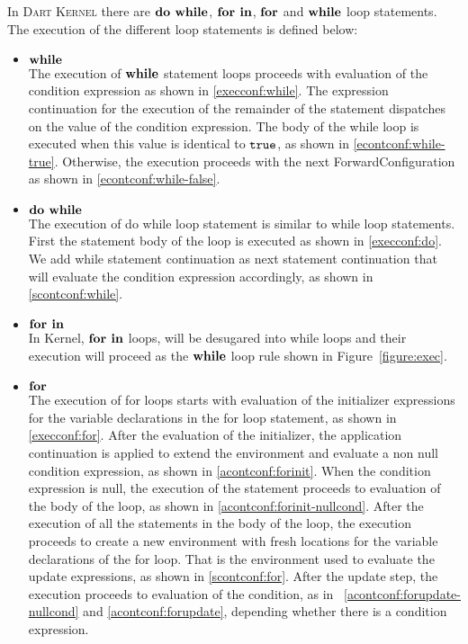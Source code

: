 \documentclass[a4paper,oneside]{article}
\newcommand{\kernel}{\textsc{Dart Kernel}}
\newcommand{\synt}[1]{\ensuremath{\text{\textbf{#1}}}}
\DeclareMathOperator{\dowhile}{\synt{do~while}}
\DeclareMathOperator{\while}{\synt{while}}
\DeclareMathOperator{\forin}{\synt{for~in}}
\DeclareMathOperator{\for}{\synt{for}}
\begin{document}
In \kernel{} there are $\dowhile$, $\forin$, $\for$ and $\while$ loop statements.
The execution of the different loop statements is defined below:

\begin{itemize}
    \item  $\while$\\
        The execution of  $\while$ statement loops proceeds with evaluation of the condition expression as shown in \eqref{execconf:while}.
        The expression continuation for the execution of the remainder of the statement dispatches on the value of the condition expression.
        The body of the while loop is executed when this value is identical to $\tt{true}$, as shown in \eqref{econtconf:while-true}.
        Otherwise, the execution proceeds with the next ForwardConfiguration as shown in \eqref{econtconf:while-false}.
    \item $\dowhile$\\
        The execution of do while loop statement is similar to while loop statements.
        First the statement body of the loop is executed as shown in \eqref{execconf:do}.
        We add while statement continuation as next statement continuation that will evaluate the condition expression accordingly, as shown in \eqref{scontconf:while}.
    \item $\forin$\\
        In Kernel, $\forin$ loops, will be desugared into while loops and their execution will proceed as the $\while$ loop rule shown in Figure~\ref{figure:exec}.
    \item $\for$\\
        The execution of for loops starts with evaluation of the initializer expressions for the variable declarations in the for loop statement, as shown in \eqref{execconf:for}.
        After the evaluation of the initializer, the application continuation is applied to extend the environment and evaluate a non null condition expression, as shown in \eqref{acontconf:forinit}.
        When the condition expression is null, the execution of the statement proceeds to evaluation of the body of the loop, as shown in \eqref{acontconf:forinit-nullcond}.
        After the execution of all the statements in the body of the loop, the execution proceeds to create a new environment with fresh locations for the variable declarations of the for loop.
        That is the environment used to evaluate the update expressions, as shown in \eqref{scontconf:for}.
        After the update step, the execution proceeds to evaluation of the condition, as in ~\eqref{acontconf:forupdate-nullcond} and \eqref{acontconf:forupdate}, depending whether there is a condition expression.
\end{itemize}
\end{document}
